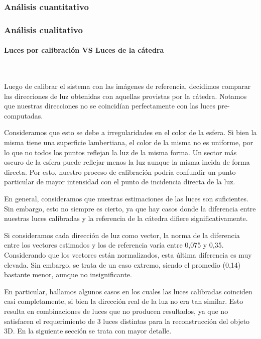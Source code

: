 \subsubsection{Análisis cuantitativo}



\subsubsection{Análisis cualitativo}

\paragraph{Luces por calibración VS Luces de la cátedra}
\

Luego de calibrar el sistema con las imágenes de referencia, decidimos comparar
las direcciones de luz obtenidas con aquellas provistas por la cátedra. Notamos
que nuestras direcciones no se coincidían perfectamente con las luces pre-computadas.

Consideramos que esto se debe a irregularidades en el color de la esfera. Si bien la misma
tiene una superficie lambertiana, el color de la misma no es uniforme, por lo que no
todos los puntos reflejan la luz de la misma forma. Un sector más oscuro de la esfera
puede reflejar menos la luz aunque la misma incida de forma directa. Por esto, nuestro proceso
de calibración podría confundir un punto particular de mayor intensidad con el punto de
incidencia directa de la luz.

En general, consideramos que nuestras estimaciones de las luces son suficientes.
Sin embargo, esto no siempre es cierto, ya que hay casos donde la diferencia
entre nuestras luces calibradas y la referencia de la cátedra difiere significativamente.

Si consideramos cada dirección de luz como vector, la norma de la diferencia
entre los vectores estimados y los de referencia varía entre 0,075 y 0,35.
Considerando que los vectores están normalizados, esta última diferencia es muy elevada.
Sin embargo, se trata de un caso extremo, siendo el promedio (0,14)
bastante menor, aunque no insignificante.

En particular, hallamos algunos casos en los cuales las luces calibradas coinciden casi
completamente, si bien la dirección real de la luz no era tan similar. Esto resulta en
combinaciones de luces que no producen resultados, ya que no satisfacen el
requerimiento de 3 luces distintas para la reconstrucción del objeto 3D.
En la siguiente sección se trata con mayor detalle.

